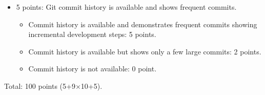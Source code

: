\documentclass[11pt]{article}
\begin{document}
\begin{itemize}
\begin{itemize}
\begin{itemize}
    \end{itemize}
  \end{itemize}
\item 5 points: Git commit history is available and shows frequent commits.
  \begin{itemize}
    \item Commit history is available and demonstrates frequent commits showing incremental
      development steps: 5 points.
    \item Commit history is available but shows only a few large commits: 2 points.
    \item Commit history is not available: 0 point. 
  \end{itemize}
\end{itemize}
Total: 100 points (5+9$\times$10+5).
\end{document}
